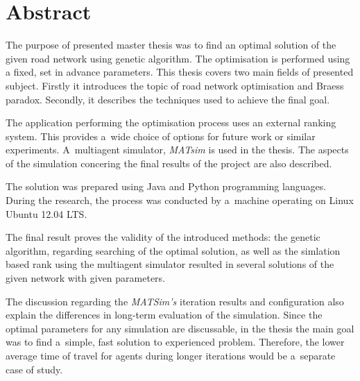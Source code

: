 \documentclass[twoside,12pt]{report}
\let\oldsection\chapter
\def\chapter{\cleardoublepage\oldsection}
\begin{document}
\clearpage
{}
{}
\chapter*{Abstract}

The purpose of presented master thesis was to find an optimal solution of the given road network using genetic algorithm. The optimisation is performed using a fixed, set in advance parameters. This thesis covers two main fields of presented subject. Firstly it introduces the topic of road network optimisation and Braess paradox. Secondly, it describes the techniques used to achieve the final goal.

The application performing the optimisation process uses an external ranking system. This provides a~wide choice of options for future work or similar experiments. A~multiagent simulator, \textit{MATsim} is used in the thesis. The aspects of the simulation concering the final results of the project are also described. 

The solution was prepared using Java and Python programming languages. During the research, the process was conducted by a~machine operating on Linux Ubuntu 12.04 LTS.

The final result proves the validity of the introduced methods: the genetic algorithm, regarding searching of the optimal solution, as well as the simlation based rank using the multiagent  simulator resulted in several solutions of the given network with given parameters.

The discussion regarding the \textit{MATSim's} iteration results and configuration also explain the differences in long-term evaluation of the simulation. Since the optimal parameters for any simulation are discussable, in the thesis the main goal was to find a~simple, fast solution to experienced problem. Therefore, the lower average time of travel for agents during longer iterations would be a~separate case of study.

\clearpage
\thispagestyle{empty}
\mbox{}


\clearpage

\end{document}
